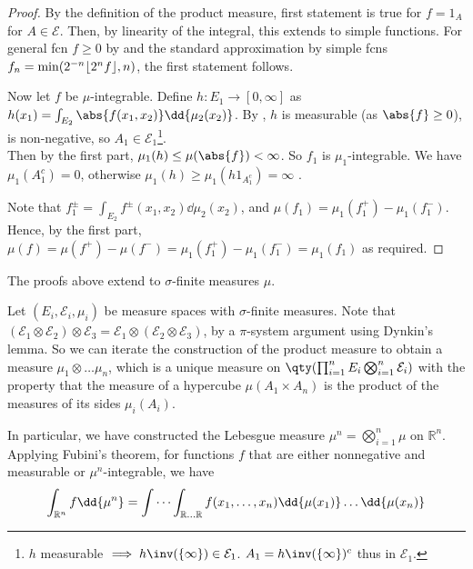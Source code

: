 \begin{proof}
	By the definition of the product measure, first statement is true for $f = 1_A$ for $A \in \mathcal{E}$.
	Then, by linearity of the integral, this extends to simple functions.
	For general fcn $f \geq 0$ by  and the standard approximation by simple fcns $f_n = \min(2^{-n} \lfloor2^n f\rfloor, n)$, the first statement follows.

	Now let $f$ be $\mu$-integrable.
	Define $h : E_1 \to [0, \infty]$ as $h(x_1) = \int_{E_2} \abs{f(x_1,x_2)} \dd{\mu_2(x_2)}$.
	By , $h$ is measurable (as $\abs{f} \geq 0$), is non-negative, so $A_1 \in \mathcal{E}_1$\footnote{$h$ measurable $\implies h\inv(\{\infty\}) \in \mathcal{E}_1$. $A_1 = h\inv(\{\infty\})^c$ thus in $\mathcal{E}_1$.}. \\
	Then by the first part, $\mu_1(h) \leq \mu(\abs{f}) < \infty$.
	So $f_1$ is $\mu_1$-integrable.
	We have $\mu_1(A_1^c) = 0$, otherwise $\mu_1(h) \geq \mu_1(h 1_{A_1^c}) = \infty$ \Lightning.

	Note that $f_1^\pm = \int_{E_2} f^\pm(x_1,x_2) \dd{\mu_2(x_2)}$, and $\mu(f_1) = \mu_1(f_1^+) - \mu_1(f_1^-)$.
	Hence, by the first part, $\mu(f) = \mu(f^+) - \mu(f^-) = \mu_1(f_1^+) - \mu_1(f_1^-) = \mu_1(f_1)$ as required.
\end{proof}

\begin{remark}
	The proofs above extend to $\sigma$-finite measures $\mu$.

	Let $(E_i, \mathcal E_i, \mu_i)$ be measure spaces with $\sigma$-finite measures.
	Note that $(\mathcal E_1 \otimes \mathcal E_2) \otimes \mathcal E_3 = \mathcal E_1 \otimes (\mathcal E_2 \otimes \mathcal E_3)$, by a $\pi$-system argument using Dynkin's lemma.
	So we can iterate the construction of the product measure to obtain a measure $\mu_1 \otimes \dots \mu_n$, which is a unique measure on $\qty(\prod_{i=1}^n E_i \bigotimes_{i=1}^n \mathcal E_i)$ with the property that the measure of a hypercube $\mu(A_1 \times A_n)$ is the product of the measures of its sides $\mu_i(A_i)$.

	In particular, we have constructed the Lebesgue measure $\mu^n = \bigotimes_{i=1}^n \mu$ on $\mathbb R^n$.
	Applying Fubini's theorem, for functions $f$ that are either nonnegative and measurable or $\mu^n$-integrable, we have
	\[ \int_{\mathbb R^n} f \dd{\mu^n} = \idotsint_{\mathbb R \dots \mathbb R} f(x_1, \dots, x_n) \dd{\mu(x_1)} \dots \dd{\mu(x_n)} \]
\end{remark}

